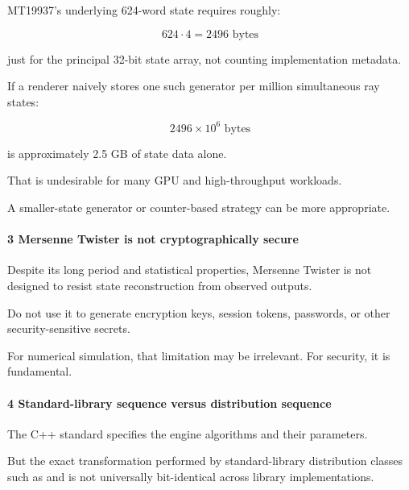 \hypertarget{02-foundations-ii-ch029-the-state-footprint}{}

MT19937's underlying 624-word state requires roughly:

\[
 624\cdot4=2496\text{ bytes}
\]

just for the principal 32-bit state array, not counting implementation metadata.

If a renderer naively stores one such generator per million simultaneous ray states:

\[
 2496\times10^6\text{ bytes}
\]

is approximately 2.5 GB of state data alone.

That is undesirable for many GPU and high-throughput workloads.

A smaller-state generator or counter-based strategy can be more appropriate.

\paragraph{3 Mersenne Twister is not cryptographically secure}\label{02-foundations-ii-ch029-mersenne-twister-is-not-cryptographically-secure}

\hypertarget{02-foundations-ii-ch029-mersenne-twister-is-not-cryptographically-secure}{}

Despite its long period and statistical properties, Mersenne Twister is not designed to resist state reconstruction from observed outputs.

Do not use it to generate encryption keys, session tokens, passwords, or other security-sensitive secrets.

For numerical simulation, that limitation may be irrelevant. For security, it is fundamental.

\paragraph{4 Standard-library sequence versus distribution sequence}\label{02-foundations-ii-ch029-standard-library-sequence-versus-distribution-sequence}

\hypertarget{02-foundations-ii-ch029-standard-library-sequence-versus-distribution-sequence}{}

The C++ standard specifies the engine algorithms and their parameters.

But the exact transformation performed by standard-library distribution classes such as  and  is not universally bit-identical across library implementations.

